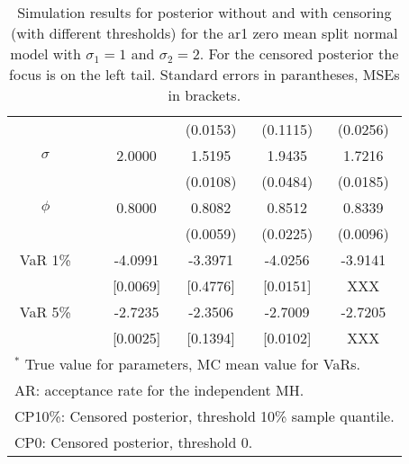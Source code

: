 {\begin{table}
\begin{tabular}{cc cccc}
&&   & (0.0153) & (0.1115) & (0.0256)  \\ 
$\sigma$&& 2.0000 & 1.5195 & 1.9435 & 1.7216  \\ 
&&   & (0.0108) & (0.0484) & (0.0185)  \\ 
$\phi$&& 0.8000 & 0.8082 & 0.8512 & 0.8339  \\ 
&&   & (0.0059) & (0.0225) & (0.0096)  \\ 
VaR 1\% && -4.0991 & -3.3971 & -4.0256 & -3.9141  \\ 
  && [0.0069] & [0.4776] & [0.0151] & XXX  \\ 
VaR 5\% && -2.7235 & -2.3506 & -2.7009 & -2.7205  \\ 
 && [0.0025] & [0.1394] & [0.0102] & XXX  \\ 
\hline 
\multicolumn{6}{l}{\footnotesize{$^*$ True value for parameters, MC mean value for VaRs.}}  \\ 
\multicolumn{6}{l}{\footnotesize{AR: acceptance rate for the independent MH.}}  \\ 
\multicolumn{6}{l}{\footnotesize{CP10\%: Censored posterior, threshold 10\% sample quantile.}}  \\ 
\multicolumn{6}{l}{\footnotesize{CP0: Censored posterior, threshold 0.}} 
\end{tabular}
 \caption{Simulation results for posterior without and with censoring (with different thresholds) for the ar1 zero mean split normal model with $\sigma_{1} = 1$ and $\sigma_{2} = 2$. For the censored posterior the focus is on the left tail. Standard errors in parantheses, MSEs in brackets.} 
\label{tab:ar1}  
\end{table}
}